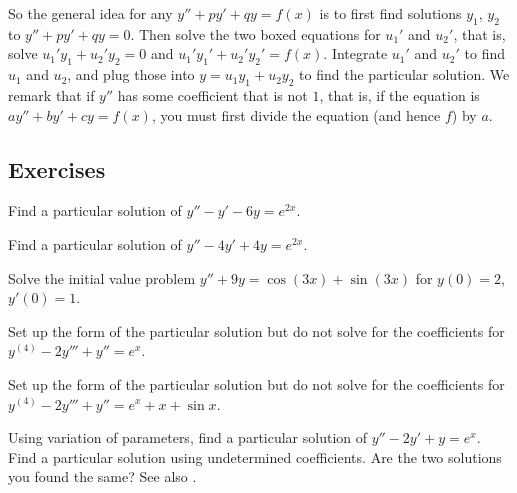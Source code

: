 \medskip

So the general idea for any $y'' + p y' + q y = f(x)$ is to first find solutions
$y_1$, $y_2$ to $y''+py'+qy = 0$.  Then solve the two boxed equations
for $u_1'$ and $u_2'$, that is, solve
$u_1' y_1 + u_2' y_2 = 0$ and $u_1' y_1' + u_2' y_2' = f(x)$.
Integrate $u_1'$ and $u_2'$ to find $u_1$ and $u_2$, and plug those into
$y = u_1 y_1 + u_2 y_2$ to find the particular solution.
We remark that if $y''$ has some coefficient that is not $1$, that is,
if the equation is $ay'' + by' + cy = f(x)$,
you must first divide the equation (and hence $f$) by $a$.

\subsection{Exercises}

\begin{exercise}
Find a particular solution of
$y''-y' -6y = e^{2x}$.
\end{exercise}

\begin{exercise}
Find a particular solution of
$y''-4y' +4y = e^{2x}$.
\end{exercise}

\begin{exercise}
Solve the initial value problem
$y''+9y = \cos (3x) + \sin (3x)$ for $y(0) = 2$, $y'(0) = 1$.
\end{exercise}

\begin{exercise}
Set up the form of the particular solution but do not solve
for the coefficients for $y^{(4)}-2y'''+y'' = e^x$.
\end{exercise}

\begin{exercise}
Set up the form of the particular solution but do not solve
for the coefficients for $y^{(4)}-2y'''+y'' = e^x + x + \sin x$.
\end{exercise}

\begin{exercise}
\pagebreak[2]
\leavevmode
\begin{tasks}
\task Using variation of parameters, find a particular solution of
$y''-2y'+y = e^x$.
\task Find a particular solution using undetermined
coefficients.
\task Are the two solutions you found the same?
See also .
\end{tasks}
\end{exercise}

